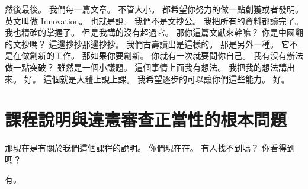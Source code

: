 \hypertarget{w01:cue:229}{}然後最後。
\hypertarget{w01:cue:230}{}我們每一篇文章。
\hypertarget{w01:cue:231}{}不管大小。
\hypertarget{w01:cue:232}{}都希望你努力的做一點創獲或者發明。
\hypertarget{w01:cue:233}{}英文叫做 Innovation。
\hypertarget{w01:cue:234}{}也就是說。
\hypertarget{w01:cue:235}{}我們不是文抄公。
\hypertarget{w01:cue:236}{}我把所有的資料都讀完了。
\hypertarget{w01:cue:237}{}我也精確的掌握了。
\hypertarget{w01:cue:238}{}但是我講的沒有超過它。
\hypertarget{w01:cue:239}{}那你這篇文獻來幹嘛？
\hypertarget{w01:cue:240}{}你是中國翻的文抄嗎？
\hypertarget{w01:cue:241}{}這邊抄抄那邊抄抄。
\hypertarget{w01:cue:242}{}我們古壽讀出是這樣的。
\hypertarget{w01:cue:243}{}那是另外一種。
\hypertarget{w01:cue:244}{}它不是在做創新的工作。
\hypertarget{w01:cue:245}{}那如果你要創新。
\hypertarget{w01:cue:246}{}你就有一次就要問你自己。
\hypertarget{w01:cue:247}{}我有沒有辦法做一點突破？
\hypertarget{w01:cue:248}{}雖然是一個小議題。
\hypertarget{w01:cue:249}{}這個事情上面我有想法。
\hypertarget{w01:cue:250}{}我把我的想法講出來。
\hypertarget{w01:cue:251}{}好。
\hypertarget{w01:cue:252}{}這個就是大體上說上課。
\hypertarget{w01:cue:253}{}我希望逐步的可以讓你們這些能力。
\hypertarget{w01:cue:254}{}好。

\section{課程說明與違憲審查正當性的根本問題}

\hypertarget{w01:cue:255}{}那現在是有關於我們這個課程的說明。
\hypertarget{w01:cue:256}{}你們現在在。
\hypertarget{w01:cue:257}{}有人找不到嗎？
\hypertarget{w01:cue:258}{}你看得到嗎？

\hypertarget{w01:cue:259}{}有。


